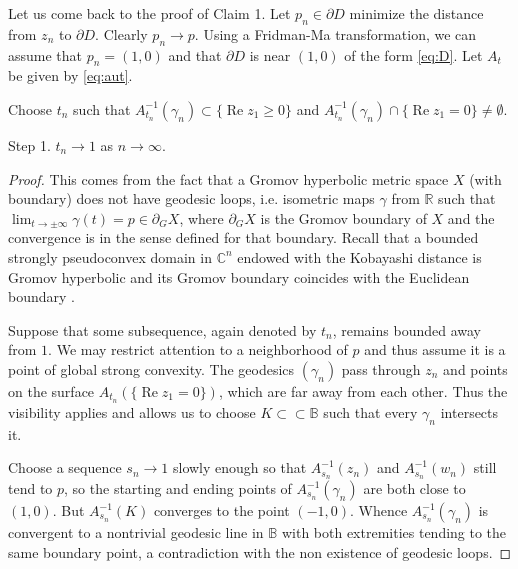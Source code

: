 \documentclass[a4paper,12pt]{amsart}
\def\re{\operatorname{Re}}
\theoremstyle{remark}\newtheorem{remark}[theorem]{Remark}
\begin{document}
Let us come back to the proof of Claim 1. Let $p_n\in \partial D$ minimize the distance from $z_n$ to $\partial D$. Clearly $p_n\to p$.
Using a Fridman-Ma transformation, we can assume that $p_n=(1,0)$ and that $\partial D$ is near $(1,0)$ of the form \eqref{eq:D}. Let $A_t$ be given by \eqref{eq:aut}. 

Choose $t_n$  such that $A^{-1}_{t_n}(\gamma_n) \subset \{\re z_1\ge 0\}$ and 
$A^{-1}_{t_n}(\gamma_n) \cap \{\re z_1=0\} \neq \emptyset$.



\bigskip


{Step 1}. $t_n\to 1$ as $n\to\infty$. 

\begin{proof} 
This comes from the fact that a 
Gromov hyperbolic metric space $X$ (with boundary) does not have geodesic loops, i.e. isometric maps $\gamma$ from $\mathbb R$ 
such that $\lim_{t\to\pm \infty} \gamma(t)=p \in \partial_G X$, where $\partial_G X$ is the Gromov 
boundary of $X$ and the convergence is in the sense defined for that boundary. Recall that a bounded strongly 
pseudoconvex domain in $\mathbb C^n$ endowed with the Kobayashi distance is Gromov hyperbolic and
its Gromov boundary coincides with the Euclidean boundary \cite{BB}.

Suppose that some subsequence, again denoted by $t_n$, remains
bounded away from $1$. We may restrict attention to a neighborhood of
 $p$ and thus assume it
 is  a point of global strong convexity. The geodesics $(\gamma_n)$ pass through $z_n$ and points on the surface $A_{t_n}\left(\{\re z_1=0\}\right)$, which are far away from each other. Thus the visibility applies and allows us to choose $K \subset \subset \mathbb B$ such that every $\gamma_n$ intersects it. 

Choose a sequence $s_n\to 1$ slowly enough so that $A_{s_n}^{-1}(z_n)$ and $A_{s_n}^{-1}(w_n)$ still tend  to $p$,
so the starting and
ending points of $A_{s_n}^{-1}(\gamma_n)$ are both close to $(1,0)$. But $A_{s_n}^{-1}(K)$ converges to the point $(-1,0)$. Whence $A_{s_n}^{-1}(\gamma_n)$ is convergent to a nontrivial geodesic line in $\mathbb B$ with both extremities tending to the same boundary point, a contradiction with the 
non existence of geodesic loops.
\end{proof}
\end{document}

